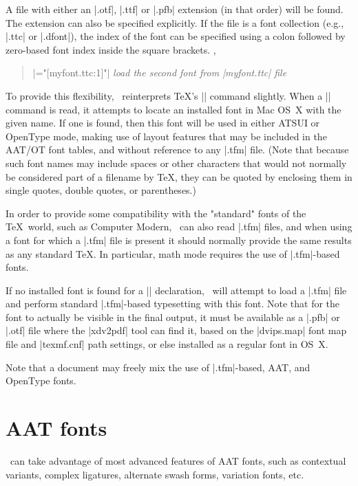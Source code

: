 A file with either an |.otf|, |.ttf| or |.pfb| extension (in that order) will be found.  The
extension can also be specified explicitly.
If the file is a font collection (e.g., |.ttc| or |.dfont|), the index of the
font can be specified using a colon followed by zero-based font index inside
the square brackets. \eg,
\begin{quote}\small
|\font\4="[myfont.ttc:1]"| \hfill {\em load the second font from |myfont.ttc| file}
\end{quote}


To provide this flexibility, \XeTeX\ reinterprets \TeX's |\font| command slightly. When a |\font| command is read, it attempts to locate an installed font in Mac OS~X with the given name. If one is found, then this font will be used in either ATSUI or OpenType mode, making use of layout features that may be included in the AAT/OT font tables, and without reference to any |.tfm| file. (Note that because such font names may include spaces or other characters that would not normally be considered part of a filename by \TeX, they can be quoted by enclosing them in single quotes, double quotes, or parentheses.)

In order to provide some compatibility with the "standard" fonts of the \TeX\ world, such as Computer Modern, \XeTeX\ can also read |.tfm| files, and when using a font for which a |.tfm| file is present it should normally provide the same results as any standard \TeX. In particular, math mode requires the use of |.tfm|-based fonts.

If no installed font is found for a |\font| declaration, \XeTeX\ will attempt to load a |.tfm| file and perform standard |.tfm|-based typesetting with this font. Note that for the font to actually be visible in the final output, it must be available as a |.pfb| or |.otf| file where the |xdv2pdf| tool can find it, based on the |dvips.map| font map file and |texmf.cnf| path settings, or else installed as a regular font in OS~X.

Note that a document may freely mix the use of |.tfm|-based, AAT, and OpenType fonts.

\section{AAT fonts}

\XeTeX\ can take advantage of most advanced features of AAT fonts, such as contextual variants, complex ligatures, alternate swash forms, variation fonts, etc.

